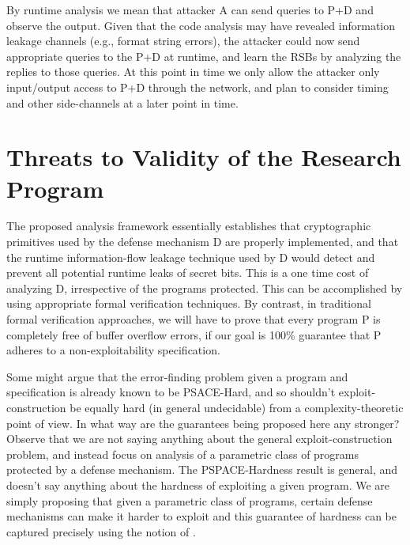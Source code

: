 \begin{enumerate}
  By runtime analysis we mean that attacker A can send queries to P+D
  and observe the output. Given that the code analysis may have
  revealed information leakage channels (e.g., format string errors),
  the attacker could now send appropriate queries to the P+D at
  runtime, and learn the RSBs by analyzing the replies to those
  queries. At this point in time we only allow the attacker only
  input/output access to P+D through the network, and plan to consider
  timing and other side-channels at a later point in time.
\end{enumerate}

\section {Threats to Validity of the Research Program}

The proposed analysis framework essentially establishes that
cryptographic primitives used by the defense mechanism D are properly
implemented, and that the runtime information-flow leakage technique
used by D would detect and prevent all potential runtime leaks of
secret bits. This is a one time cost of analyzing D, irrespective of
the programs protected. This can be accomplished by using appropriate
formal verification techniques. By contrast, in traditional formal
verification approaches, we will have to prove that every program P is
completely free of buffer overflow errors, if our goal is 100\%
guarantee that P adheres to a non-exploitability specification.

 Some might argue that the
error-finding problem given a program and specification is already
known to be PSACE-Hard, and so shouldn't exploit-construction be
equally hard (in general undecidable) from a complexity-theoretic
point of view. In what way are the guarantees being proposed here any
stronger? Observe that we are not saying anything about the general
exploit-construction problem, and instead focus on analysis of a
parametric class of programs protected by a defense mechanism. The
PSPACE-Hardness result is general, and doesn't say anything about the
hardness of exploiting a given program. We are simply proposing that
given a parametric class of programs, certain defense mechanisms can
make it harder to exploit and this guarantee of hardness can be
captured precisely using the notion of \resistance.

